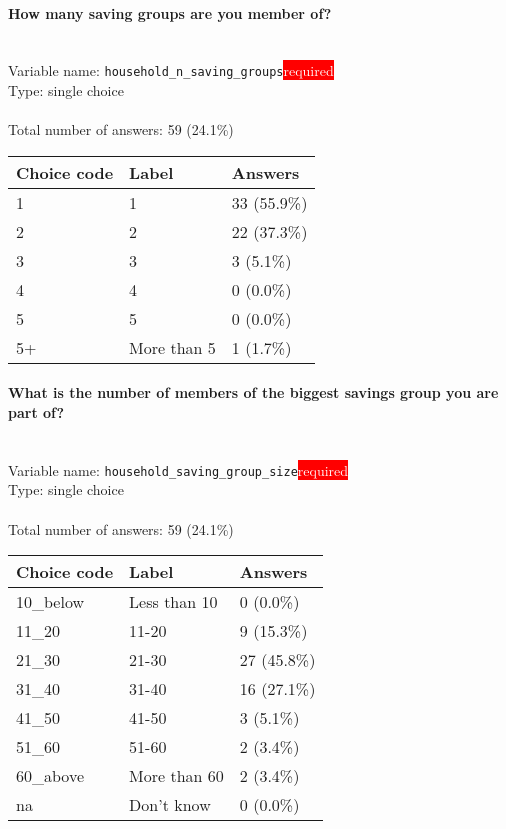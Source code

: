 \documentclass[11.5pt, a4paper]{scrartcl}
\begin{document}
\paragraph{How many saving groups are you member of?}
\  \\Variable name: \texttt{household\_n\_saving\_groups}\hfill\colorbox{red}{\small{\textcolor{white}{required}}}\\
 Type: single choice\\
\\Total number of answers: 59 (24.1\%)
\\[0.2em] \begin{tabular}{p{4cm}|p{8cm}|p{3cm}}
Choice code & Label & Answers \\
\hline
1 & 1& \cellcolor{color2}33 (55.9\%)\\
\cellcolor{mygray} 2 & \cellcolor{mygray}2 & \cellcolor{color1}22 (37.3\%)\\
3 & 3& \cellcolor{color0}3 (5.1\%)\\
\cellcolor{mygray} 4 & \cellcolor{mygray}4 & \cellcolor{color0}0 (0.0\%)\\
5 & 5& \cellcolor{color0}0 (0.0\%)\\
\cellcolor{mygray} 5+ & \cellcolor{mygray}More than 5 & \cellcolor{color0}1 (1.7\%)\\
\end{tabular}
\paragraph{What is the number of members of the biggest savings group you are part of?}
\  \\Variable name: \texttt{household\_saving\_group\_size}\hfill\colorbox{red}{\small{\textcolor{white}{required}}}\\
 Type: single choice\\
\\Total number of answers: 59 (24.1\%)
\\[0.2em] \begin{tabular}{p{4cm}|p{8cm}|p{3cm}}
Choice code & Label & Answers \\
\hline
10\_below & Less than 10& \cellcolor{color0}0 (0.0\%)\\
\cellcolor{mygray} 11\_20 & \cellcolor{mygray}11-20 & \cellcolor{color0}9 (15.3\%)\\
21\_30 & 21-30& \cellcolor{color2}27 (45.8\%)\\
\cellcolor{mygray} 31\_40 & \cellcolor{mygray}31-40 & \cellcolor{color1}16 (27.1\%)\\
41\_50 & 41-50& \cellcolor{color0}3 (5.1\%)\\
\cellcolor{mygray} 51\_60 & \cellcolor{mygray}51-60 & \cellcolor{color0}2 (3.4\%)\\
60\_above & More than 60& \cellcolor{color0}2 (3.4\%)\\
\cellcolor{mygray} na & \cellcolor{mygray}Don’t know & \cellcolor{color0}0 (0.0\%)\\
\end{tabular}
\end{document}
